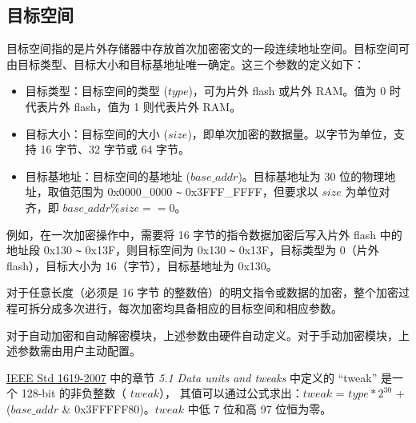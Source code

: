 \documentclass[main\_\_CN.tex]{subfiles}
\begin{document}
\subsection{目标空间}
\label{sec:extmemencr-target-space}

目标空间指的是片外存储器中存放首次加密密文的一段连续地址空间。目标空间可由目标类型、目标大小和目标基地址唯一确定。这三个参数的定义如下：

\begin{itemize}
    \item 目标类型：目标空间的类型 (\begin{math} type \end{math})，可为片外 flash 或片外 RAM。值为 0 时代表片外 flash，值为 1 则代表片外 RAM。
    \item 目标大小：目标空间的大小 (\begin{math} size \end{math})，即单次加密的数据量。以字节为单位，支持 16 字节、32 字节或 64 字节。
    \item 目标基地址：目标空间的基地址 (\begin{math} base\_addr\end{math})。目标基地址为 30 位的物理地址，取值范围为 0x0000\_0000 \verb+~+ 0x3FFF\_FFFF，但要求以 \begin{math} size \end{math} 为单位对齐，即 \begin{math} base\_addr \% size == 0 \end{math}。
\end{itemize}

例如，在一次加密操作中，需要将 16 字节的指令数据加密后写入片外 flash 中的地址段 0x130 \verb+~+ 0x13F，则目标空间为 0x130 \verb+~+ 0x13F，目标类型为 0（片外 flash），目标大小为 16（字节），目标基地址为 0x130。

对于任意长度（必须是 16 字节 的整数倍）的明文指令或数据的加密，整个加密过程可拆分成多次进行，每次加密均具备相应的目标空间和相应参数。

对于自动加密和自动解密模块，上述参数由硬件自动定义。对于手动加密模块，上述参数需由用户主动配置。

\begin{tiplisting}
\vspace{-2em}
\begin{enumerate}
     \href{https://ieeexplore.ieee.org/document/4493450}{IEEE Std 1619-2007} 中的章节 \textit{5.1 Data units and tweaks} 中定义的 “tweak”  是一个 128-bit 的非负整数（ \begin{math} tweak \end{math}），
    其值可以通过公式求出：\begin{math} tweak \end{math} = \begin{math} type * 2^{30}\end{math} + (\begin{math} base\_addr \end{math} \& 0x3FFFFF80)。\begin{math} tweak \end{math} 中低 7 位和高 97 位恒为零。
\end{enumerate}
\end{tiplisting}
\end{document}
